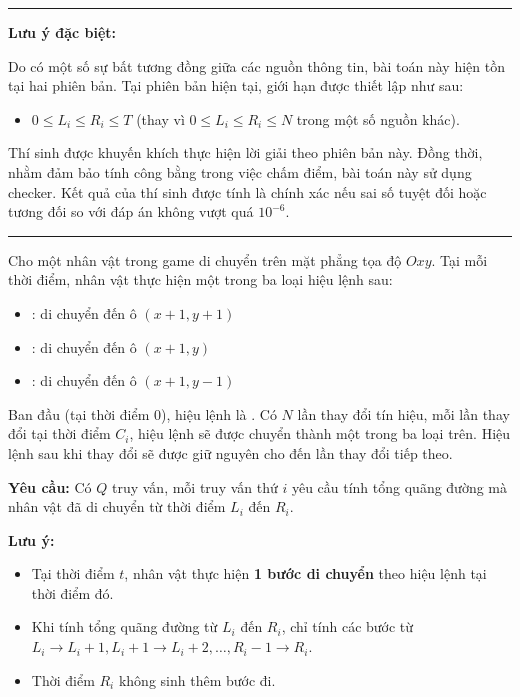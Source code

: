
\begin{center}
    \begin{minipage}{\textwidth}
        \hrule
        \vspace{0.25cm}
        \noindent \textbf{Lưu ý đặc biệt:}
        
        Do có một số sự bất tương đồng giữa các nguồn thông tin, bài toán này hiện tồn tại hai phiên bản. Tại phiên bản hiện tại, giới hạn được thiết lập như sau:
        \begin{itemize}
            \item $0 \le L_i \le R_i \le T$ (thay vì $0 \le L_i \le R_i \le N$ trong một số nguồn khác).
        \end{itemize}
        
        \noindent Thí sinh được khuyến khích thực hiện lời giải theo phiên bản này. Đồng thời, nhằm đảm bảo tính công bằng trong việc chấm điểm, bài toán này sử dụng checker. Kết quả của thí sinh được tính là chính xác nếu sai số tuyệt đối hoặc tương đối so với đáp án không vượt quá $10^{-6}$.
        \vspace{0.25cm}
        \hrule
    \end{minipage}
\end{center}

Cho một nhân vật trong game di chuyển trên mặt phẳng tọa độ $Oxy$. Tại mỗi thời điểm, nhân vật thực hiện một trong ba loại hiệu lệnh sau:
\begin{itemize}
    \item \fbox{\texttt{/}} : di chuyển đến ô $(x+1, y+1)$
    \item \fbox{\texttt{-}} : di chuyển đến ô $(x+1, y)$
    \item \fbox{\texttt{\textbackslash}} : di chuyển đến ô $(x+1, y-1)$
\end{itemize}

Ban đầu (tại thời điểm $0$), hiệu lệnh là \fbox{\texttt{-}}. Có $N$ lần thay đổi tín hiệu, mỗi lần thay đổi tại thời điểm $C_i$, hiệu lệnh sẽ được chuyển thành một trong ba loại trên. Hiệu lệnh sau khi thay đổi sẽ được giữ nguyên cho đến lần thay đổi tiếp theo.

\medskip
\textbf{Yêu cầu:} Có $Q$ truy vấn, mỗi truy vấn thứ $i$ yêu cầu tính tổng quãng đường mà nhân vật đã di chuyển từ thời điểm $L_i$ đến $R_i$.

\bigskip
\textbf{Lưu ý:}
\begin{itemize}
    \item Tại thời điểm $t$, nhân vật thực hiện \textbf{1 bước di chuyển} theo hiệu lệnh tại thời điểm đó.  
    \item Khi tính tổng quãng đường từ $L_i$ đến $R_i$, chỉ tính các bước từ $L_i \to L_i+1, L_i+1 \to L_i+2, \dots, R_i-1 \to R_i$.  
    \item Thời điểm $R_i$ không sinh thêm bước đi.
\end{itemize}

